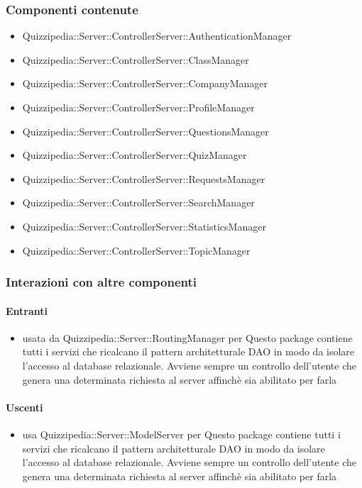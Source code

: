 \subsubsection{Componenti contenute}
\begin{itemize}
\item Quizzipedia::Server::ControllerServer::AuthenticationManager
\item Quizzipedia::Server::ControllerServer::ClassManager
\item Quizzipedia::Server::ControllerServer::CompanyManager
\item Quizzipedia::Server::ControllerServer::ProfileManager
\item Quizzipedia::Server::ControllerServer::QuestionsManager
\item Quizzipedia::Server::ControllerServer::QuizManager
\item Quizzipedia::Server::ControllerServer::RequestsManager
\item Quizzipedia::Server::ControllerServer::SearchManager
\item Quizzipedia::Server::ControllerServer::StatisticsManager
\item Quizzipedia::Server::ControllerServer::TopicManager
\end{itemize}
\subsubsection{Interazioni con altre componenti}
\paragraph{Entranti}
\begin{itemize}
\item usata da Quizzipedia::Server::RoutingManager per Questo package contiene tutti i servizi che ricalcano il pattern architetturale DAO in modo da isolare l'accesso al database relazionale. Avviene sempre un controllo dell'utente che genera una determinata richiesta al server affinchè sia abilitato per farla
\end{itemize}
\paragraph{Uscenti}
\begin{itemize}
\item usa Quizzipedia::Server::ModelServer per Questo package contiene tutti i servizi che ricalcano il pattern architetturale DAO in modo da isolare l'accesso al database relazionale. Avviene sempre un controllo dell'utente che genera una determinata richiesta al server affinchè sia abilitato per farla
\end{itemize}
